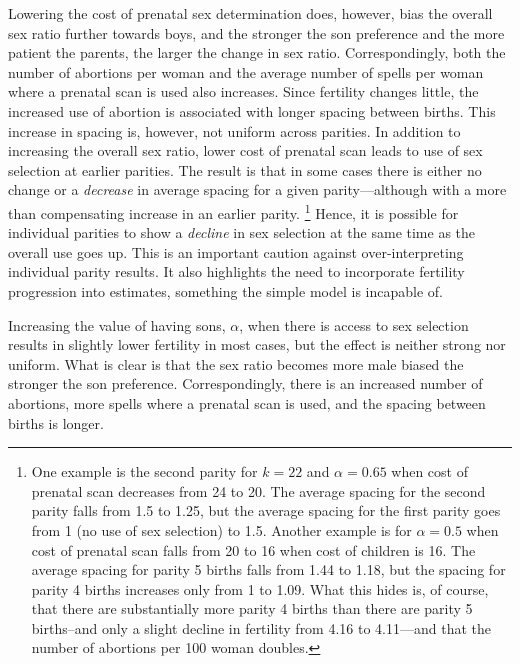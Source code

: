 \documentclass[12pt,letterpaper]{article}
\begin{document}


Lowering the cost of prenatal sex determination does, however, bias the overall sex 
ratio further towards boys, and the stronger the son preference and the 
more patient the parents, the larger the change in sex ratio.
Correspondingly, both the number of abortions per woman and the
average number of spells per woman where a prenatal scan is used also increases.
Since fertility changes little, the increased use of abortion
is associated with longer spacing between births.
This increase in spacing is, however, not uniform across parities.
In addition to increasing the overall sex ratio, lower cost of prenatal 
scan leads to use of sex selection at earlier parities.
The result is that in some cases there is either no change or a \emph{decrease} 
in average spacing for a given parity---although with a more than compensating 
increase in an earlier parity.%
\footnote{
One example is the second parity for $k= 22$ and $\alpha = 0.65$
when cost of prenatal scan decreases from 24 to 20.
The average spacing for the second parity falls from 1.5 to 1.25,
but the average spacing for the first parity goes from 1 (no
use of sex selection) to 1.5.
Another example is for $\alpha = 0.5$ when cost of prenatal scan falls 
from 20 to 16 when cost of children is 16. 
The average spacing for parity 5 births falls from 1.44 to 1.18, but
the spacing for parity 4 births increases only from 1 to 1.09. 
What this hides is, of course, that there are substantially more 
parity 4 births than there are parity 5 births--and only a slight 
decline in fertility from 4.16 to 4.11---and that the number of
abortions per 100 woman doubles. 
}
Hence, it is possible for individual parities to show a \emph{decline}
in sex selection at the same time as the overall use goes up.
This is an important caution against over-interpreting
individual parity results.
It also highlights the need to incorporate fertility progression into
estimates, something the simple model is incapable of.



Increasing the value of having sons, $\alpha$, when there is access to 
sex selection results in slightly lower fertility in most cases,
but the effect is neither strong nor uniform.
What is clear is that the sex ratio becomes more male biased 
the stronger the son preference.
Correspondingly, there is an increased number of abortions,
more spells where a prenatal scan is used,
and the spacing between births is longer.
\end{document}
